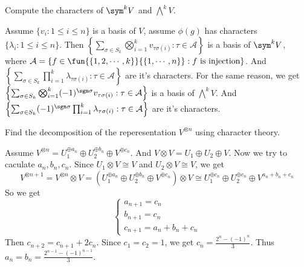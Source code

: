 \documentclass{ctexart}
\newif\ifpreface
\begin{document}
\large
\setlength{\baselineskip}{1.2em}
\ifpreface
    
\newgeometry{left=2cm,right=2cm,top=2cm,bottom=2cm}
\else
{}
\maketitle
\fi
\begin{problem}
  Compute the characters of \(\sym^k V \) and \(\bigwedge^k V\).
\end{problem}

\begin{solution}
  Assume \(\{ v_i:1 \leq i \leq n\}\) is a basis of \(V\), assume \(\phi( g)\) has characters \(\{ \lambda_i:1 \leq i \leq n\}\). 
  Then \(\left\{ \sum_{\sigma \in S_k} \bigotimes_{i=1}^{k} v_{\tau\sigma ( i)}:\tau \in \mathcal{A}\right\}\) is a basis of \(\sym^k V\), where \(\mathcal{A}=\left\{f \in \fun{\{ 1,2,\cdots,k\}}{\{ 1,\cdots,n\}}: f \text{ is injection}\right\}\). 
  And \(\left\{\sum_{\sigma \in S_k} \prod_{i=1}^{k} \lambda_{\tau \sigma( i)}:\tau \in \mathcal{A}\right\}\) are it's characters. 
  For the same reason, we get \\
  \(\left\{ \sum_{\sigma \in S_k} \bigotimes_{i=1}^{k} ( -1)^{\sgn \sigma}v_{\tau\sigma ( i)}:\tau \in \mathcal{A}\right\}\) is a basis of \(\bigwedge^k V\).
  And \(\left\{\sum_{\sigma \in S_k} ( -1)^{\sgn \sigma}\prod_{i=1}^{k} \lambda_{\tau \sigma( i)}:\tau \in \mathcal{A}\right\}\) are it's characters. 
\end{solution}

\begin{problem}
  Find the decomposition of the reperesentation \(V^{\otimes n}\) using character theory.  
\end{problem}

\begin{solution}
  Assume \(V^{\otimes n}=U_1^{\oplus a_n}\oplus U_2^{\oplus b_n}\oplus V^{\oplus c_n}\). 
  And \(V \otimes V = U_1 \oplus U_2 \oplus V\). Now we try to caculate \(a_n,b_n,c_n\). 
  Since \(U_1 \otimes V \cong V\) and \(U_2 \otimes V \cong V\), we get 
  \[
    V^{\otimes n+1} = V^{\otimes n} \otimes V =( U_1^{\oplus a_n}\oplus U_2^{\oplus b_n} \oplus V^{\oplus c_n})\otimes V \cong U_1^{\oplus c_n}\oplus U_2^{\oplus c_n} \oplus V^{a_n+b_n+c_n}
  \]
  So we get 
  \[
    \begin{cases}
    a_{n+1}=c_n\\
    b_{n+1}=c_n\\
    c_{n+1}=a_n+b_n+c_n
    \end{cases}
  \]
  Then \(c_{n+2}=c_{n+1}+2c_n\). Since \(c_1=c_2=1\), we get \(c_n=\frac{2^n-( -1)^n}{3}\). 
  Thus \(a_n=b_n=\frac{2^{n-1}-( -1)^{n-1}}{3}\).
\end{solution}
\end{document}

